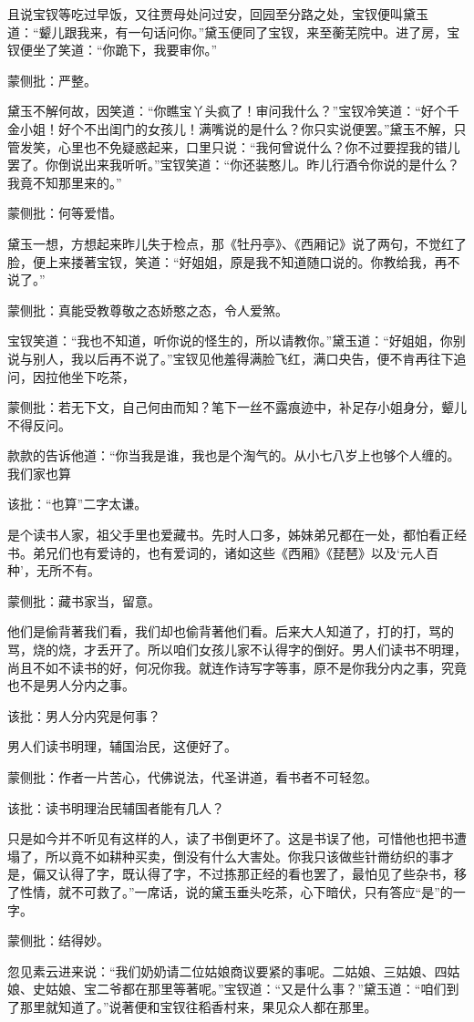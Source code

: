 \begin{parag}


    且说宝钗等吃过早饭，又往贾母处问过安，回园至分路之处，宝钗便叫黛玉道：“颦儿跟我来，有一句话问你。”黛玉便同了宝钗，来至蘅芜院中。进了房，宝钗便坐了笑道：“你跪下，我要审你。”\begin{note}蒙侧批：严整。\end{note}黛玉不解何故，因笑道：“你瞧宝丫头疯了！审问我什么？”宝钗冷笑道：“好个千金小姐！好个不出闺门的女孩儿！满嘴说的是什么？你只实说便罢。”黛玉不解，只管发笑，心里也不免疑惑起来，口里只说：“我何曾说什么？你不过要捏我的错儿罢了。你倒说出来我听听。”宝钗笑道：“你还装憨儿。昨儿行酒令你说的是什么？我竟不知那里来的。”\begin{note}蒙侧批：何等爱惜。\end{note}黛玉一想，方想起来昨儿失于检点，那《牡丹亭》、《西厢记》说了两句，不觉红了脸，便上来搂著宝钗，笑道：“好姐姐，原是我不知道随口说的。你教给我，再不说了。”\begin{note}蒙侧批：真能受教尊敬之态娇憨之态，令人爱煞。\end{note}宝钗笑道：“我也不知道，听你说的怪生的，所以请教你。”黛玉道：“好姐姐，你别说与别人，我以后再不说了。”宝钗见他羞得满脸飞红，满口央告，便不肯再往下追问，因拉他坐下吃茶，\begin{note}蒙侧批：若无下文，自己何由而知？笔下一丝不露痕迹中，补足存小姐身分，颦儿不得反问。\end{note}款款的告诉他道：“你当我是谁，我也是个淘气的。从小七八岁上也够个人缠的。我们家也算\begin{note}该批：“也算”二字太谦。\end{note}是个读书人家，祖父手里也爱藏书。先时人口多，姊妹弟兄都在一处，都怕看正经书。弟兄们也有爱诗的，也有爱词的，诸如这些《西厢》《琵琶》以及‘元人百种’，无所不有。\begin{note}蒙侧批：藏书家当，留意。\end{note}他们是偷背著我们看，我们却也偷背著他们看。后来大人知道了，打的打，骂的骂，烧的烧，才丢开了。所以咱们女孩儿家不认得字的倒好。男人们读书不明理，尚且不如不读书的好，何况你我。就连作诗写字等事，原不是你我分内之事，究竟也不是男人分内之事。\begin{note}该批：男人分内究是何事？\end{note}男人们读书明理，辅国治民，这便好了。\begin{note}蒙侧批：作者一片苦心，代佛说法，代圣讲道，看书者不可轻忽。\end{note}\begin{note}该批：读书明理治民辅国者能有几人？\end{note}只是如今并不听见有这样的人，读了书倒更坏了。这是书误了他，可惜他也把书遭塌了，所以竟不如耕种买卖，倒没有什么大害处。你我只该做些针黹纺织的事才是，偏又认得了字，既认得了字，不过拣那正经的看也罢了，最怕见了些杂书，移了性情，就不可救了。”一席话，说的黛玉垂头吃茶，心下暗伏，只有答应“是”的一字。\begin{note}蒙侧批：结得妙。\end{note}忽见素云进来说：“我们奶奶请二位姑娘商议要紧的事呢。二姑娘、三姑娘、四姑娘、史姑娘、宝二爷都在那里等著呢。”宝钗道：“又是什么事？”黛玉道：“咱们到了那里就知道了。”说著便和宝钗往稻香村来，果见众人都在那里。
\end{parag}


